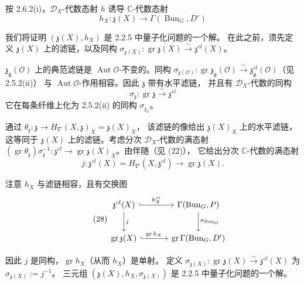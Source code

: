 
按 2.6.2(i)，$\mathcal{D}_X$-代数态射 $h$ 诱导 $\mathbb{C}$-代数态射
\[
  h_X:\mathfrak{z}(X)\longrightarrow\Gamma(\operatorname{Bun}_G,D')
\]

我们将证明 $(\mathfrak{z}(X),h_X)$ 是 2.2.5 中量子化问题的一个解。
在此之前，须先定义 $\mathfrak{z}(X)$ 上的滤链，以及同构
$\sigma_{\mathfrak{z}(X)}:\operatorname{gr}\mathfrak{z}(X)\xrightarrow{\sim}\mathfrak{z}^{cl}(X)$。

$\mathfrak{z}_{\mathfrak{g}}(\mathcal{O})$ 上的典范滤链是
$\operatorname{Aut}\mathcal{O}$-不变的。同构
$\sigma_{\mathfrak{z}(\mathcal{O})}:\operatorname{gr}\mathfrak{z}_{\mathfrak{g}}(\mathcal{O})
\xrightarrow{\sim}\mathfrak{z}^{cl}_{\mathfrak{g}}(\mathcal{O})$（见 2.5.2(ii)）
与 $\operatorname{Aut}\mathcal{O}$-作用相容。因此 $\mathfrak{z}$ 带有水平滤链，
并且有 $\mathcal{D}_X$-代数的同构
\[
  \sigma_{\mathfrak{z}}:\operatorname{gr}\mathfrak{z}\xrightarrow{\sim}\mathfrak{z}^{cl}
\]
它在每条纤维上化为 2.5.2(ii) 的同构 $\sigma_{\mathfrak{z}_x}$。

通过 $\theta_{\mathfrak{z}}:\mathfrak{z}\to H_\nabla(X,\mathfrak{z})_X=\mathfrak{z}(X)_X$，
该滤链的像给出 $\mathfrak{z}(X)_X$ 上的水平滤链，
这等同于 $\mathfrak{z}(X)$ 上的滤链。考虑分次 $\mathcal{D}_X$-代数的满态射
$(\operatorname{gr}\theta_{\mathfrak{z}})\sigma_{\mathfrak{z}}^{-1}:\mathfrak{z}^{cl}\to
\operatorname{gr}\mathfrak{z}(X)_X$。由伴随（见 (22)），
它给出分次 $\mathbb{C}$-代数的满态射
\[
  j:\mathfrak{z}^{cl}(X)=H_\nabla(X,\mathfrak{z}^{cl})\longrightarrow\operatorname{gr}\mathfrak{z}(X).
\]

注意 $h_X$ 与滤链相容，且有交换图
\begin{equation}\tag{28}
\begin{tikzcd}[column sep=3.4em, row sep=2.4em]
\mathfrak{z}^{cl}(X) \arrow[r, hook, "h^{cl}_X"] \arrow[d, "j"]
  & \Gamma(\operatorname{Bun}_G,P) \arrow[d, "\sigma_{\operatorname{Bun}_G}"] \\
\operatorname{gr}\mathfrak{z}(X) \arrow[r, hook, "\operatorname{gr}h_X"]
  & \operatorname{gr}\Gamma(\operatorname{Bun}_G,D')
\end{tikzcd}
\end{equation}

因此 $j$ 是同构，$\operatorname{gr}h_X$（从而 $h_X$）是单射。
定义 $\sigma_{\mathfrak{z}(X)}:\operatorname{gr}\mathfrak{z}(X)\xrightarrow{\sim}
\mathfrak{z}^{cl}(X)$ 为 $\sigma_{\mathfrak{z}(X)}:=j^{-1}$。
三元组 $(\mathfrak{z}(X),h_X,\sigma_{\mathfrak{z}(X)})$ 是 2.2.5 中量子化问题的一个解。

